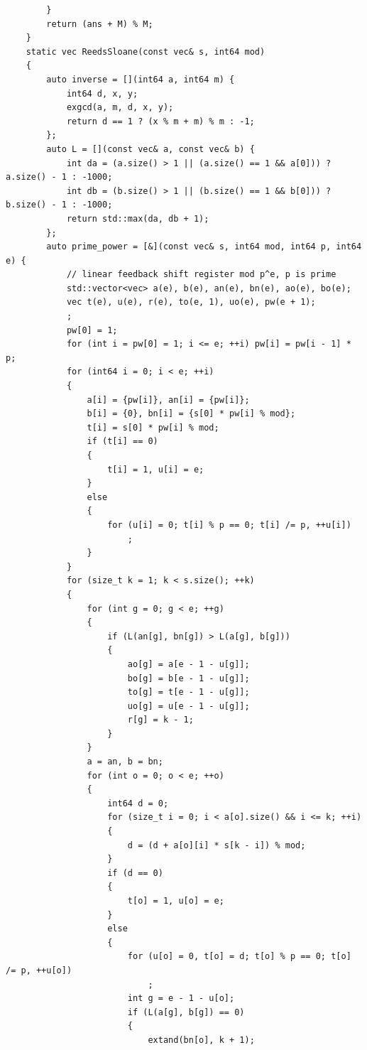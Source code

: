 \documentclass[twoside]{article}
\begin{document}
\begin{lstlisting}
        }
        return (ans + M) % M;
    }
    static vec ReedsSloane(const vec& s, int64 mod)
    {
        auto inverse = [](int64 a, int64 m) {
            int64 d, x, y;
            exgcd(a, m, d, x, y);
            return d == 1 ? (x % m + m) % m : -1;
        };
        auto L = [](const vec& a, const vec& b) {
            int da = (a.size() > 1 || (a.size() == 1 && a[0])) ? a.size() - 1 : -1000;
            int db = (b.size() > 1 || (b.size() == 1 && b[0])) ? b.size() - 1 : -1000;
            return std::max(da, db + 1);
        };
        auto prime_power = [&](const vec& s, int64 mod, int64 p, int64 e) {
            // linear feedback shift register mod p^e, p is prime
            std::vector<vec> a(e), b(e), an(e), bn(e), ao(e), bo(e);
            vec t(e), u(e), r(e), to(e, 1), uo(e), pw(e + 1);
            ;
            pw[0] = 1;
            for (int i = pw[0] = 1; i <= e; ++i) pw[i] = pw[i - 1] * p;
            for (int64 i = 0; i < e; ++i)
            {
                a[i] = {pw[i]}, an[i] = {pw[i]};
                b[i] = {0}, bn[i] = {s[0] * pw[i] % mod};
                t[i] = s[0] * pw[i] % mod;
                if (t[i] == 0)
                {
                    t[i] = 1, u[i] = e;
                }
                else
                {
                    for (u[i] = 0; t[i] % p == 0; t[i] /= p, ++u[i])
                        ;
                }
            }
            for (size_t k = 1; k < s.size(); ++k)
            {
                for (int g = 0; g < e; ++g)
                {
                    if (L(an[g], bn[g]) > L(a[g], b[g]))
                    {
                        ao[g] = a[e - 1 - u[g]];
                        bo[g] = b[e - 1 - u[g]];
                        to[g] = t[e - 1 - u[g]];
                        uo[g] = u[e - 1 - u[g]];
                        r[g] = k - 1;
                    }
                }
                a = an, b = bn;
                for (int o = 0; o < e; ++o)
                {
                    int64 d = 0;
                    for (size_t i = 0; i < a[o].size() && i <= k; ++i)
                    {
                        d = (d + a[o][i] * s[k - i]) % mod;
                    }
                    if (d == 0)
                    {
                        t[o] = 1, u[o] = e;
                    }
                    else
                    {
                        for (u[o] = 0, t[o] = d; t[o] % p == 0; t[o] /= p, ++u[o])
                            ;
                        int g = e - 1 - u[o];
                        if (L(a[g], b[g]) == 0)
                        {
                            extand(bn[o], k + 1);

\end{lstlisting}
\end{document}
